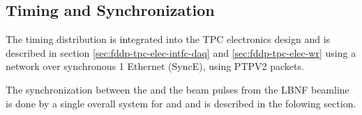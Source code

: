 \subsection{Timing and Synchronization}
\label{sec:fd-daq-timing}


The timing distribution is integrated into the TPC electronics design
and is described in section \ref{sec:fddp-tpc-elec-intfc-daq} and
\ref{sec:fddp-tpc-elec-wr} using a  network over
synchronous \SI{1}{\Gbps} Ethernet (SyncE), using PTPV2 packets.

The synchronization between the  and the beam pulses from
the LBNF beamline is done by a single overall system for \single 
and \dual  and is described in the folowing section.


